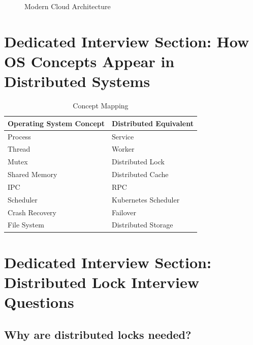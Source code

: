 \begin{figure}[H]
\centering
{}
\caption{Modern Cloud Architecture}
\end{figure}

\section{Dedicated Interview Section: How OS Concepts Appear in Distributed Systems}

\begin{table}[H]
\centering
\begin{tabular}{ll}
\toprule
Operating System Concept & Distributed Equivalent \\
\midrule
Process & Service \\
Thread & Worker \\
Mutex & Distributed Lock \\
Shared Memory & Distributed Cache \\
IPC & RPC \\
Scheduler & Kubernetes Scheduler \\
Crash Recovery & Failover \\
File System & Distributed Storage \\
\bottomrule
\end{tabular}
\caption{Concept Mapping}
\end{table}

\section{Dedicated Interview Section: Distributed Lock Interview Questions}

\subsection*{Why are distributed locks needed?}

